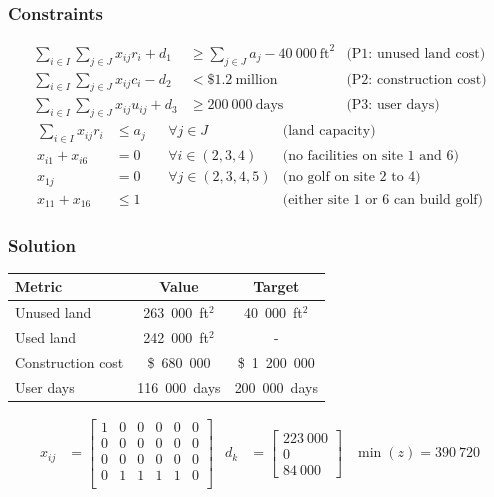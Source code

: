 \documentclass[a4paper,11pt]{article}
\begin{document}
\subsubsection{Constraints}
\begin{align}
	\sum_{i\in I} \sum_{j\in J} x_{ij}r_i +d_1 & \geq \sum_{j\in J}a_j -40\ 000\ \text{ft}^2  & \text{(P1: unused land cost)}\\
 \sum_{i\in I} \sum_{j\in J} x_{ij}c_i - d_2& < \$1.2\  \text{million} & \text{(P2: construction cost)} \\
\sum_{i\in I} \sum_{j\in J} x_{ij}u_{ij} +d_3 & \geq 200\ 000\ \text{days}  & \text{(P3: user days)} 
\end{align}
\begin{align}
\sum_{i\in I} x_{ij}r_i &\leq a_j && \forall j\in J & \text{(land capacity)}        \\
x_{i1}+x_{i6} &= 0  && \forall i \in (2,3,4)  & \text{(no facilities on site 1 and 6)}\\
x_{1j} &= 0 && \forall j\in (2,3,4,5) & \text{(no golf on site 2 to 4)}\\
x_{11} + x_{16} &\leq 1 && & \text{(either site 1 or 6 can build golf)}
\end{align}

\subsubsection{Solution}
\begin{center}
	\begin{tabular}{l c c}
		\hline
		\hline
		\textbf{Metric} & \textbf{Value} & \textbf{Target}\\
		\hline
		\hline
		Unused land & 263\ 000\ ft$^2$ & 40\ 000\ ft$^2$\\
		Used land & 242\ 000\ ft$^2$ & -\\
		Construction cost & \$\ 680\ 000 & \$\ 1\ 200\ 000 \\
		User days & 116\ 000\ days & 200\ 000\ days\\
		\hline
	\end{tabular}
\end{center}

\begin{align}
x_{ij} &= 
	\begin{bmatrix} 
    1  &  0  &  0  &  0  &  0  &  0 \\
    0  &  0  &  0  &  0  &  0  &  0 \\
    0  &  0  &  0  &  0  &  0  &  0 \\
    0  &  1  &  1  &  1  &  1  &  0 \\
	\end{bmatrix}
&d_k &= 	\begin{bmatrix} 
    223\ 000 \\
    0 \\
    84\ 000 \end{bmatrix} & \min(z) = 390\ 720
\end{align}
\end{document}
